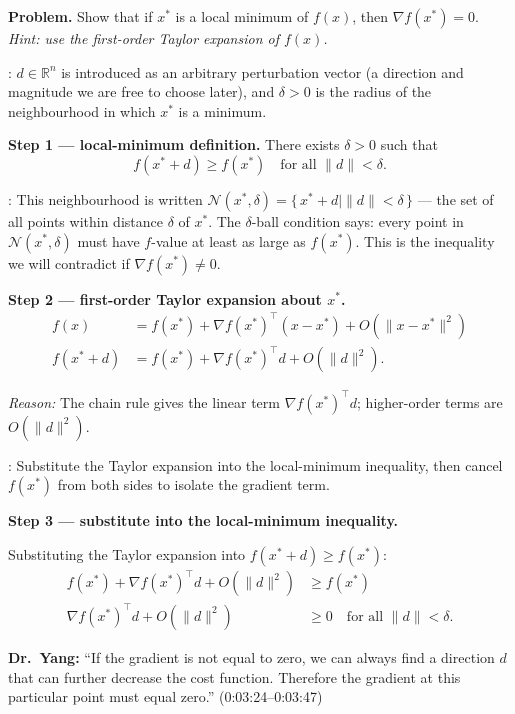 \documentclass[10pt,a4paper]{article}
\newcommand{\reason}[1]{%
  \begin{mdframed}[backgroundcolor=reasonbg, linewidth=0.4pt,
    innertopmargin=3pt, innerbottommargin=3pt,
    innerleftmargin=6pt, innerrightmargin=6pt]
    \small\textit{Reason:} \small #1
  \end{mdframed}\vspace{2pt}}
\newcommand{\lecnote}[1]{%
  \begin{mdframed}[backgroundcolor=notebg, linewidth=0.4pt,
    innertopmargin=3pt, innerbottommargin=3pt,
    innerleftmargin=6pt, innerrightmargin=6pt]
    \small\textbf{Dr.\ Yang:} \small #1
  \end{mdframed}\vspace{2pt}}
\newcommand{\agentnote}[1]{%
  \begin{mdframed}[backgroundcolor=notebg, linewidth=0.4pt,
    innertopmargin=3pt, innerbottommargin=3pt,
    innerleftmargin=6pt, innerrightmargin=6pt]
    \small: \small #1
  \end{mdframed}\vspace{2pt}}
\begin{document}
\noindent\textbf{Problem.} Show that if $x^*$ is a local minimum of $f(x)$,
then $\nabla f(x^*)=0$.
\textit{Hint: use the first-order Taylor expansion of $f(x)$.}

\vspace{6pt}
\agentnote{  $d\in\mathbb{R}^n$ is introduced as an arbitrary
         perturbation vector (a direction and magnitude we are free to choose later),
         and $\delta>0$ is the radius of the neighbourhood in which $x^*$ is a minimum.}

\textbf{Step 1 --- local-minimum definition.}
There exists $\delta>0$ such that
\[
  f(x^*+d)\ge f(x^*)\quad\text{for all }\|d\|<\delta.
\]
\agentnote{This neighbourhood is written
         $\mathcal{N}(x^*,\delta)=\{\,x^*+d\mid\|d\|<\delta\,\}$
         --- the set of all points within distance $\delta$ of $x^*$.
         The $\delta$-ball condition says: every point in $\mathcal{N}(x^*,\delta)$
         must have $f$-value at least as large as $f(x^*)$.
         This is the inequality we will contradict if $\nabla f(x^*)\neq 0$.}

\textbf{Step 2 --- first-order Taylor expansion about $x^*$.}
\begin{align*}
  f(x)     &= f(x^*) + \nabla f(x^*)^\top(x-x^*) + O(\|x-x^*\|^2) \\
  f(x^*+d) &= f(x^*) + \nabla f(x^*)^\top d       + O(\|d\|^2).
\end{align*}

\reason{The chain rule gives the linear term $\nabla f(x^*)^\top d$;
        higher-order terms are $O(\|d\|^2)$.}

\agentnote{Substitute the Taylor expansion into the local-minimum inequality,
         then cancel $f(x^*)$ from both sides to isolate the gradient term.}

\textbf{Step 3 --- substitute into the local-minimum inequality.}

Substituting the Taylor expansion into $f(x^*+d)\ge f(x^*)$:
\begin{align*}
  f(x^*) + \nabla f(x^*)^\top d + O(\|d\|^2) &\ge f(x^*) \\
  \nabla f(x^*)^\top d + O(\|d\|^2)           &\ge 0\quad\text{for all }\|d\|<\delta.
\end{align*}

\lecnote{``If the gradient is not equal to zero, we can always find a direction
         $d$ that can further decrease the cost function. Therefore the gradient
         at this particular point must equal zero.'' (0:03:24--0:03:47)\\
        }
\end{document}
